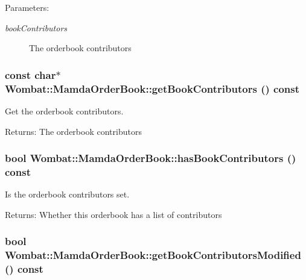 \begin{Desc}
\item[Parameters:]
\begin{description}
\item[{\em book\-Contributors}]The orderbook contributors \end{description}
\end{Desc}
\hypertarget{classWombat_1_1MamdaOrderBook_18811f7038dde0b36fe946dbf1cb65c9}{
\subsubsection[getBookContributors]{\setlength{\rightskip}{0pt plus 5cm}const char$\ast$ Wombat::Mamda\-Order\-Book::get\-Book\-Contributors () const}}
\label{classWombat_1_1MamdaOrderBook_18811f7038dde0b36fe946dbf1cb65c9}


Get the orderbook contributors. 

\begin{Desc}
\item[Returns:]The orderbook contributors \end{Desc}
\hypertarget{classWombat_1_1MamdaOrderBook_2af8676616a58763d82d6e9978c85814}{
\subsubsection[hasBookContributors]{\setlength{\rightskip}{0pt plus 5cm}bool Wombat::Mamda\-Order\-Book::has\-Book\-Contributors () const}}
\label{classWombat_1_1MamdaOrderBook_2af8676616a58763d82d6e9978c85814}


Is the orderbook contributors set. 

\begin{Desc}
\item[Returns:]Whether this orderbook has a list of contributors \end{Desc}
\hypertarget{classWombat_1_1MamdaOrderBook_9b2b2ce6be6cabc94cd61ac911049206}{
\subsubsection[getBookContributorsModified]{\setlength{\rightskip}{0pt plus 5cm}bool Wombat::Mamda\-Order\-Book::get\-Book\-Contributors\-Modified () const}}
\label{classWombat_1_1MamdaOrderBook_9b2b2ce6be6cabc94cd61ac911049206}


